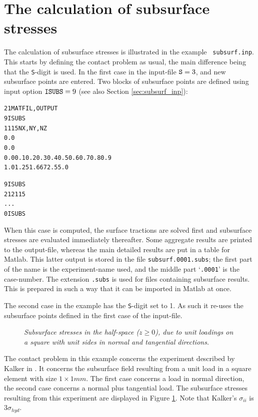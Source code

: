 \documentclass[12pt]{report}
\begin{document}
\section{The calculation of subsurface stresses}
\label{sec:ex_subsurf}

The calculation of subsurface stresses is illustrated in the example {\tt
subsurf.inp}. This starts by defining the contact problem as usual, the
main difference being that the {\tt S}-digit is used. In the first case in
the input-file ${\tt S}=3$, and new subsurface points are entered. Two
blocks of subsurface points are defined using input option ${\tt
ISUBS}=9$ (see also Section \ref{sec:subsurf_inp}):
\begin{alltt}\small
   2   1        MATFIL, OUTPUT
   9            ISUBS
   1   1   15   NX, NY, NZ
   0.0
   0.0
   0.0   0.1   0.2    0.3   0.4   0.5   0.6   0.7   0.8   0.9
   1.0   1.25  1.667  2.5   5.0

   9            ISUBS
  21   21   15   %
   ...
  0             ISUBS
\end{alltt}
When this case is computed, the surface tractions are solved first
and subsurface stresses are evaluated immediately thereafter. Some
aggregate results are printed to the output-file, whereas the main
detailed results are put in a table for Matlab. This latter output
is stored in the file {\tt subsurf.0001\-.subs}; the first part of the
name is the experiment-name used, and the middle part `{\tt .0001}' is
the case-number. The extension {\tt .subs} is used for files containing
subsurface results. This is prepared in such a way that it can be
imported in Matlab at once.

The second case in the example has the {\tt S}-digit set to 1. As such it
re-uses the subsurface points defined in the first case of the
input-file.

\begin{figure}[bt]
\centering
{}
\caption{\em Subsurface stresses in the half-space ($z\ge 0$), due to unit
loadings on a square with unit sides in normal and tangential directions.}
\label{fig:subsurf1}
\end{figure}

The contact problem in this example concerns the experiment described by
Kalker in \cite[paragraph 5.2.2.4]{Kalker1990}. It concerns the subsurface
field resulting from a unit load in a square element with size $1\times
1\unit{mm}$. The first case concerns a load in normal direction, the second case
concerns a normal plus tangential load. The subsurface stresses resulting
from this experiment are displayed in Figure \ref{fig:subsurf1}. Note that
Kalker's $\sigma_{ii}$ is $3\sigma_{hyd}$. 
\end{document}
